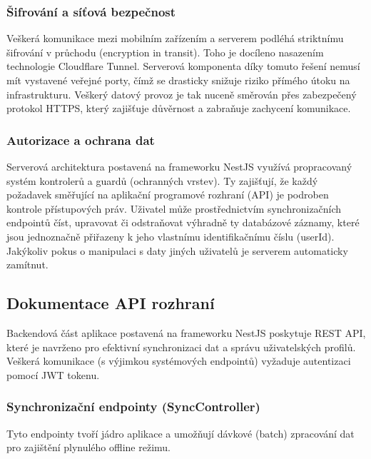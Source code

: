 \documentclass[12pt, a4paper, oneside]{article}
\begin{document}
	\subsubsection{Šifrování a síťová bezpečnost}
	Veškerá komunikace mezi mobilním zařízením a serverem podléhá striktnímu šifrování v průchodu (encryption in transit). Toho je docíleno nasazením technologie Cloudflare Tunnel. Serverová komponenta díky tomuto řešení nemusí mít vystavené veřejné porty, čímž se drasticky snižuje riziko přímého útoku na infrastrukturu. Veškerý datový provoz je tak nuceně směrován přes zabezpečený protokol HTTPS, který zajišťuje důvěrnost a zabraňuje zachycení komunikace.
	
	\subsubsection{Autorizace a ochrana dat}
	Serverová architektura postavená na frameworku NestJS využívá propracovaný systém kontrolerů a guardů (ochranných vrstev). Ty zajišťují, že každý požadavek směřující na aplikační programové rozhraní (API) je podroben kontrole přístupových práv. Uživatel může prostřednictvím synchronizačních endpointů číst, upravovat či odstraňovat výhradně ty databázové záznamy, které jsou jednoznačně přiřazeny k jeho vlastnímu identifikačnímu číslu (userId). Jakýkoliv pokus o manipulaci s daty jiných uživatelů je serverem automaticky zamítnut.
	
	
	
	
	\subsection{Dokumentace API rozhraní}
	
	Backendová část aplikace postavená na frameworku NestJS poskytuje REST API, které je navrženo pro efektivní synchronizaci dat a správu uživatelských profilů. Veškerá komunikace (s výjimkou systémových endpointů) vyžaduje autentizaci pomocí JWT tokenu.
	
	\subsubsection{Synchronizační endpointy (SyncController)}
	Tyto endpointy tvoří jádro aplikace a umožňují dávkové (batch) zpracování dat pro zajištění plynulého offline režimu.
	
\end{document}

